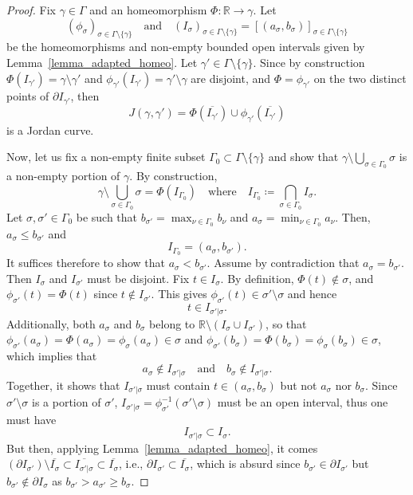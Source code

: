 \documentclass[a4paper, 11pt]{article} %
\theoremstyle{plain}
\newcommand{\R}{\mathbb{R}}
\newcommand{\1}{\mathds 1}
\numberwithin{equation}{section}
\begin{document}
\begin{proof}
    Fix $\gamma\in\Gamma$ and an homeomorphism $\Phi:\R\to\gamma$. Let 
        \[(\phi_\sigma)_{\sigma\in\Gamma\setminus\{\gamma\}}\quad\text{and}\quad(I_\sigma)_{\sigma\in\Gamma\setminus\{\gamma\}}=[(a_\sigma,b_\sigma)]_{\sigma\in\Gamma\setminus\{\gamma\}}\]
    be the homeomorphisms and non-empty bounded open intervals given by Lemma~\ref{lemma_adapted_homeo}. Let $\gamma'\in\Gamma\setminus\{\gamma\}$. Since by construction $\Phi(I_{\gamma'})=\gamma\setminus\gamma'$ and $\phi_{\gamma'}(I_{\gamma'})=\gamma'\setminus\gamma$ are disjoint, and $\Phi=\phi_{\gamma'}$ on the two distinct points of $\partial I_{\gamma'}$, then
        \[J(\gamma,\gamma')=\Phi(\overline{I_{\gamma'}})\cup\phi_{\gamma'}(\overline{I_{\gamma'}})\]
    is a Jordan curve.

    Now, let us fix a non-empty finite subset $\Gamma_0\subset\Gamma\setminus\{\gamma\}$ and show that $\gamma\setminus\bigcup_{\sigma\in\Gamma_0}\sigma$ is a non-empty portion of $\gamma$. By construction,
        \[\gamma\setminus\bigcup_{\sigma\in\Gamma_0}\sigma=\Phi(I_{\Gamma_0})\quad\text{where}\quad I_{\Gamma_0}\coloneqq\bigcap_{\sigma\in\Gamma_0}I_\sigma.\]
    Let $\sigma,\sigma'\in\Gamma_0$ be such that $b_{\sigma'}=\max_{\nu\in\Gamma_0} b_\nu$ and $a_{\sigma}=\min_{\nu\in\Gamma_0} a_\nu$. Then, $a_{\sigma}\leq b_{\sigma'}$ and
        \[I_{\Gamma_0}=(a_{\sigma}, b_{\sigma'}).\]
    It suffices therefore to show that $a_{\sigma}<b_{\sigma'}$. Assume by contradiction that $a_{\sigma}=b_{\sigma'}$. Then $I_{\sigma}$ and $I_{\sigma'}$ must be disjoint. Fix $t\in I_{\sigma}$. By definition, $\Phi(t)\notin\sigma$, and $\phi_{\sigma'}(t)=\Phi(t)$ since $t\notin I_{\sigma'}$. This gives $\phi_{\sigma'}(t)\in\sigma'\setminus\sigma$ and hence
        \[t\in I_{\sigma'|\sigma}.\]
    Additionally, both $a_{\sigma}$ and $b_{\sigma}$ belong to $\R\setminus(I_{\sigma}\cup I_{\sigma'})$, so that $\phi_{\sigma'}(a_{\sigma})=\Phi(a_{\sigma})=\phi_{\sigma}(a_{\sigma})\in\sigma$ and $\phi_{\sigma'}(b_{\sigma})=\Phi(b_{\sigma})=\phi_{\sigma}(b_{\sigma})\in\sigma$, which implies that
        \[a_{\sigma}\notin I_{\sigma'|\sigma}\quad\text{and}\quad b_{\sigma}\notin I_{\sigma'|\sigma}.\]
    Together, it shows that $I_{\sigma'|\sigma}$ must contain $t\in(a_\sigma,b_\sigma)$ but not $a_\sigma$ nor $b_\sigma$. Since $\sigma'\setminus\sigma$ is a portion of $\sigma'$, $I_{\sigma'|\sigma}=\phi_{\sigma'}^{-1}(\sigma'\setminus\sigma)$ must be an open interval, thus one must have
        \[I_{\sigma'|\sigma}\subset I_\sigma.\]
    But then, applying Lemma~\ref{lemma_adapted_homeo}, it comes $(\partial I_{\sigma'})\setminus\overline{I_\sigma}\subset\overline{I_{\sigma'|\sigma}}\subset\overline{I_\sigma}$, i.e., $\partial I_{\sigma'}\subset\overline{I_\sigma}$, which is absurd since $b_{\sigma'}\in\partial I_{\sigma'}$ but $b_{\sigma'}\notin\partial I_\sigma$ as $b_{\sigma'}>a_{\sigma'}\geq b_\sigma$.


\end{proof}
\end{document}
